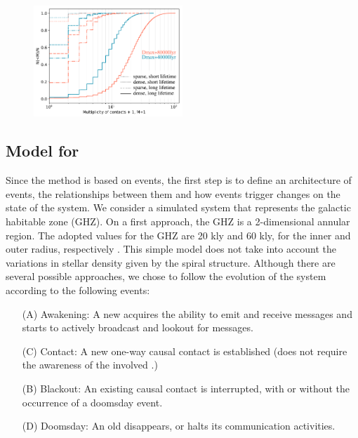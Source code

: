 

           
\begin{figure} \centering
   \includegraphics[width=0.5\textwidth]{F_number_of_contacts.pdf}
    \label{F_number_of_contacts}
\end{figure}
        

\subsection{Model for \cetis{}}

Since the method is based on events, the first step is to define an
architecture of events, the relationships between them and how events
trigger changes on the state of the system.
%
We consider a simulated system that represents the galactic habitable
zone (GHZ).
%
On a first approach, the GHZ is a 2-dimensional annular region.
%
The adopted values for the GHZ are 20 kly and 60 kly, for the inner
and outer radius, respectively \citep{lineweaver_galactic_2004}.
%
This simple model does not take into account the variations in stellar
density given by the spiral structure.
%
Although there are several possible approaches, we chose to follow the
evolution of the system according to the following events:

\begin{enumerate}
   \item[(A)] Awakening: A new \ceti{} acquires the ability to emit
      and receive messages and starts to actively broadcast and
      lookout for messages.
   \item[(C)] Contact: A new one-way causal contact is established
      (does not require the awareness of the involved \cetis{}.)
   \item[(B)] Blackout: An existing causal contact is interrupted,
      with or without the occurrence of a doomsday event.
   \item[(D)] Doomsday: An old \ceti{} disappears, or halts its
      communication activities.
\end{enumerate}

